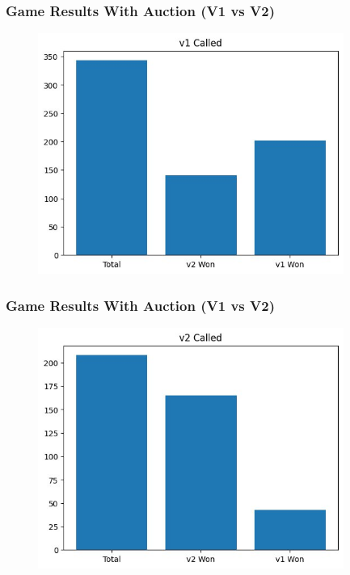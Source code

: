 \documentclass{beamer}
\begin{document}
\begin{frame}\frametitle{Game Results With Auction (V1 vs V2)}
\begin{center}
        \begin{figure}
	    \includegraphics[width=10cm]{v1v2_1.png}
        \end{figure}
\end{center}
\end{frame}

\begin{frame}\frametitle{Game Results With Auction (V1 vs V2)}
\begin{center}
        \begin{figure}
	    \includegraphics[width=10cm]{v1v2_2.png}
        \end{figure}
\end{center}
\end{frame}
\end{document}
